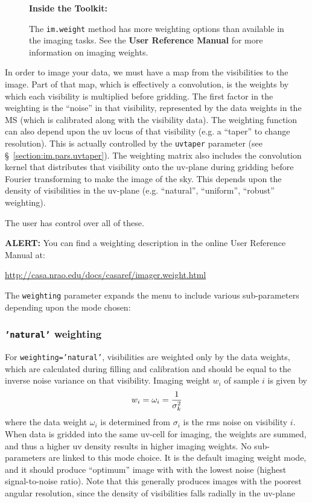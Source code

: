 \begin{wrapfigure}{r}{2.5in}
  \begin{boxedminipage}{2.5in}
     \centerline{\bf Inside the Toolkit:}
     The {\tt im.weight} method has more weighting options
     than available in the imaging tasks.  See the 
     {\bf User Reference Manual} for more information on
     imaging weights.
  \end{boxedminipage}
\end{wrapfigure}

In order to image your data, we must have a map from the visibilities
to the image.  Part of that map, which is effectively a convolution,
is the weights by which each visibility is multiplied before gridding.
The first factor in the weighting is the ``noise'' in that visibility,
represented by the data weights in the MS (which is calibrated along
with the visibility data).
The weighting function can also depend upon the uv locus of that visibility
(e.g. a ``taper'' to change resolution).  This is actually controlled
by the {\tt uvtaper} parameter (see \S~\ref{section:im.pars.uvtaper}).
The weighting matrix also includes the convolution kernel that
distributes that visibility onto the uv-plane during gridding before
Fourier transforming to make the image of the sky.  This depends upon
the density of visibilities in the uv-plane (e.g. ``natural'',
``uniform'', ``robust'' weighting).

The user has control over all of these.

{\bf ALERT:} You can find a weighting description in the online
User Reference Manual at:

\url{http://casa.nrao.edu/docs/casaref/imager.weight.html}


The {\tt weighting} parameter expands the menu to include various 
sub-parameters depending upon the mode chosen:

\subsubsection{{\tt 'natural'} weighting }
\label{section:im.pars.weighting.natural}

For {\tt weighting='natural'}, visibilities are weighted only by the
data weights, which are calculated during filling and calibration and
should be equal to the inverse noise variance on that visibility.
Imaging weight $w_i$ of sample $i$ is given by
\begin{equation}
  w_i = \omega_i = {1 \over \sigma^2_k}
\end{equation}
where the data weight $\omega_i$ is determined from $\sigma_i$ is the
rms noise on visibility $i$.
When data is gridded into the same uv-cell for imaging, the weights
are summed, and thus a higher uv density results in higher imaging
weights.  No sub-parameters are linked to this mode choice.  It is the
default imaging weight mode, and it should produce ``optimum'' image
with with the lowest noise (highest signal-to-noise ratio).  Note that
this generally produces images with the poorest angular resolution,
since the density of visibilities falls radially in the uv-plane


